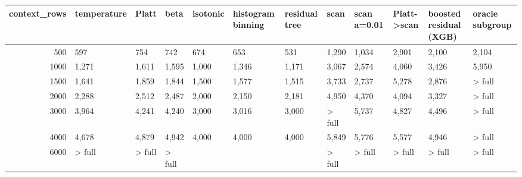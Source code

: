 \begin{tabular}{rlllllllllll}
\toprule
context_rows & temperature & Platt & beta & isotonic & histogram binning & residual tree & scan & scan a=0.01 & Platt->scan & boosted residual (XGB) & oracle subgroup \\
\midrule
500 & 597 & 754 & 742 & 674 & 653 & 531 & 1,290 & 1,034 & 2,901 & 2,100 & 2,104 \\
1000 & 1,271 & 1,611 & 1,595 & 1,000 & 1,346 & 1,171 & 3,067 & 2,574 & 4,060 & 3,426 & 5,950 \\
1500 & 1,641 & 1,859 & 1,844 & 1,500 & 1,577 & 1,515 & 3,733 & 2,737 & 5,278 & 2,876 & > full \\
2000 & 2,288 & 2,512 & 2,487 & 2,000 & 2,150 & 2,181 & 4,950 & 4,370 & 4,094 & 3,327 & > full \\
3000 & 3,964 & 4,241 & 4,240 & 3,000 & 3,016 & 3,000 & > full & 5,737 & 4,827 & 4,496 & > full \\
4000 & 4,678 & 4,879 & 4,942 & 4,000 & 4,000 & 4,000 & 5,849 & 5,776 & 5,577 & 4,946 & > full \\
6000 & > full & > full & > full &  &  &  & > full & > full & > full & > full & > full \\
\bottomrule
\end{tabular}
